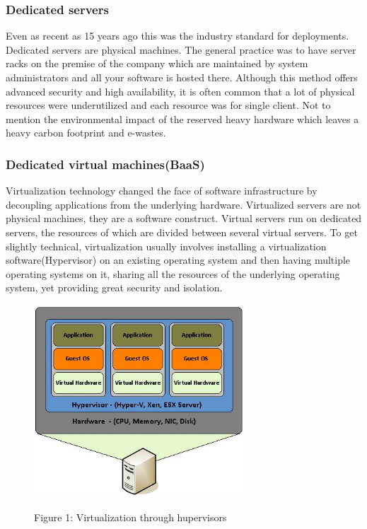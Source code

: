 \documentclass[12pt,titlepage]{article}
\begin{document}
\subsubsection{Dedicated servers}
\label{sec:org8b81a44}
Even as recent as 15 years ago this was the industry standard for deployments. Dedicated servers
are physical machines. The general practice was to have server racks on the premise
of the company which are maintained by system administrators and all your
software is
hosted there. Although this method offers advanced security and high
availability, it is often common that a lot of physical resources were
underutilized and each resource was for single client. Not to mention the
environmental impact of the reserved heavy hardware which leaves a heavy carbon
footprint and e-wastes.


\subsubsection{Dedicated virtual machines(BaaS)}
\label{sec:org9ac6cd2}
Virtualization technology changed the face of software infrastructure by decoupling
applications from the underlying hardware. Virtualized servers are not physical
machines, they are a software construct. Virtual servers run on dedicated
servers, the resources of which are divided between several virtual servers.
To get slightly technical, virtualization usually involves installing a virtualization software(Hypervisor) on an
existing operating system and then having multiple operating systems on it,
sharing all the resources of the underlying operating system, yet providing
great security and isolation.

\begin{figure}[!h]
    \caption{Figure 1: Virtualization through hupervisors}
    \centering
    \includegraphics[width=80mm]{./thesis_images/virtual_machines.JPG}
    \label{fig:testing the label}
\end{figure}
\end{document}
